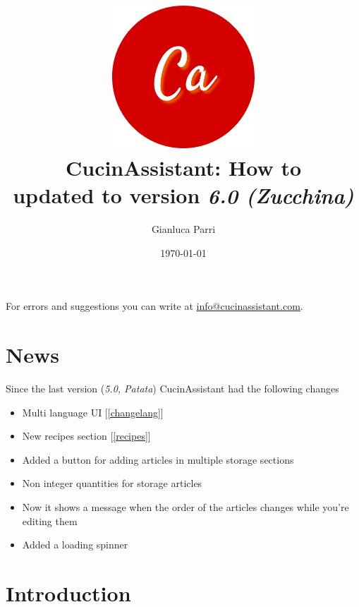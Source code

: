 \documentclass[12pt, a4paper]{report}
\begin{document}
    \title{
        \includegraphics[width=0.4\textwidth]{assets/logo.png}\\
        [1cm]CucinAssistant: How to\\
        \large updated to version \emph{6.0 (Zucchina)}
    }
    \author{Gianluca Parri}
    \date{\today}
    \maketitle



    \tableofcontents
    \vfill
    \noindent For errors and suggestions you can write at \href{mailto:info@cucinassistant.com}{\mbox{info@cucinassistant.com}}.



    \chapter{News}
    
    Since the last version (\emph{5.0, Patata}) CucinAssistant had the following changes

    \begin{itemize}
        \item Multi language UI [\ref{changelang}]
        \item New recipes section [\ref{recipes}]
        \item Added a button for adding articles in multiple storage sections
        \item Non integer quantities for storage articles
        \item Now it shows a message when the order of the articles changes while you're editing them
        \item Added a loading spinner
    \end{itemize}



    \chapter{Introduction}
\end{document}
